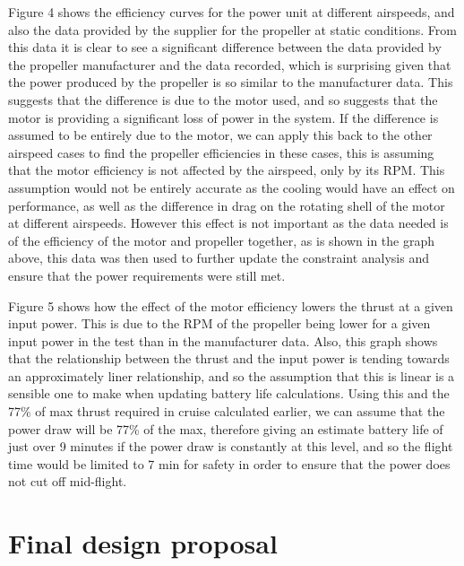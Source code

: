 \documentclass[../../main.tex]{subfiles}
\begin{document}
Figure 4 shows the efficiency curves for the power unit at different airspeeds, and also the data provided by the supplier for the propeller at static conditions.
From this data it is clear to see a significant difference between the data provided by the propeller manufacturer and the data recorded, which is surprising given that the power produced by the propeller is so similar to the manufacturer data.
This suggests that the difference is due to the motor used, and so suggests that the motor is providing a significant loss of power in the system.
If the difference is assumed to be entirely due to the motor, we can apply this back to the other airspeed cases to find the propeller efficiencies in these cases, this is assuming that the motor efficiency is not affected by the airspeed, only by its RPM.
This assumption would not be entirely accurate as the cooling would have an effect on performance, as well as the difference in drag on the rotating shell of the motor at different airspeeds.
However this effect is not important as the data needed is of the efficiency of the motor and propeller together, as is shown in the graph above, this data was then used to further update the constraint analysis and ensure that the power requirements were still met. 


Figure 5 shows how the effect of the motor efficiency lowers the thrust at a given input power.
This is due to the RPM of the propeller being lower for a given input power in the test than in the manufacturer data.
Also, this graph shows that the relationship between the thrust and the input power is tending towards an approximately liner relationship, and so the assumption that this is linear is a sensible one to make when updating battery life calculations.
Using this and the 77\% of max thrust required in cruise calculated earlier, we can assume that the power draw will be 77\% of the max, therefore giving an estimate battery life of just over 9 minutes if the power draw is constantly at this level, and so the flight time would be limited to 7 min for safety in order to ensure that the power does not cut off mid-flight. 

\section{Final design proposal} \label{sec:design-process:final-design-proposal}
\end{document}
